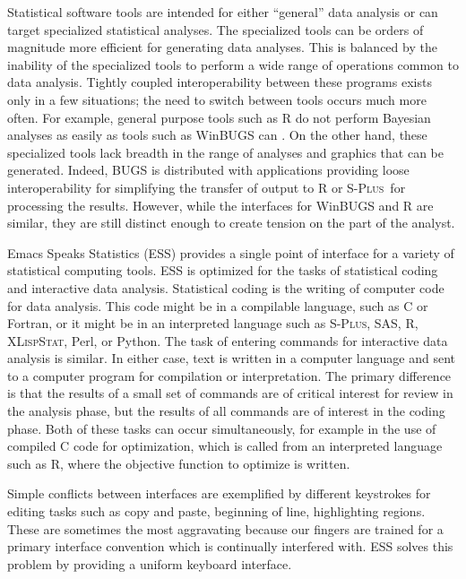 \documentclass{article}
\newcommand*{\Splus}{\textsc{S-Plus}}
\newcommand*{\XLispStat}{\textsc{XLispStat}}
\begin{document}
Statistical software tools are intended for either ``general'' data
analysis or can target specialized statistical analyses.  The
specialized tools can be orders of magnitude more efficient for
generating data analyses.  This is balanced by the inability of the
specialized tools to perform a wide range of operations common to data
analysis.  Tightly coupled interoperability between these programs
exists only in a few situations; the need to switch between tools
occurs much more often.  For example, general purpose tools such as R
\citep{ihak:gent:1996} do not perform Bayesian analyses as easily as
tools such as WinBUGS can \citep{SpieThomBest:1999}.  On the other
hand, these specialized tools lack breadth in the range of analyses
and graphics that can be generated.  Indeed, BUGS is distributed with
applications providing loose interoperability for simplifying the
transfer of output to R or \Splus\ for processing the results.
However, while the interfaces for WinBUGS and R are similar, they are
still distinct enough to create tension on the part of the analyst.

Emacs Speaks Statistics (ESS) \citep{ESS} provides a single point of
interface for a variety of statistical computing tools.  ESS is
optimized for the tasks of statistical coding and interactive data
analysis.  Statistical coding is the writing of computer code for data
analysis.  This code might be in a compilable language, such as C or
Fortran, or it might be in an interpreted language such as \Splus,
SAS, R, \XLispStat, Perl, or Python.  The task of entering commands
for interactive data analysis is similar.  In either case, text is
written in a computer language and sent to a computer program for
compilation or interpretation.  The primary difference is that the
results of a small set of commands are of critical interest for review
in the analysis phase, but the results of all commands are of interest
in the coding phase.  Both of these tasks can occur simultaneously,
for example in the use of compiled C code for optimization, which is
called from an interpreted language such as R, where the objective
function to optimize is written.

Simple conflicts between interfaces are exemplified by different
keystrokes for editing tasks such as copy and paste, beginning of
line, highlighting regions.  These are sometimes the most aggravating
because our fingers are trained for a primary interface convention
which is continually interfered with.  ESS solves this problem by
providing a uniform keyboard interface.
\end{document}
